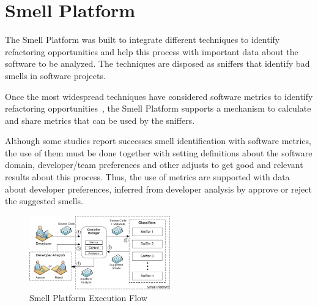 \documentclass[conference]{IEEEtran}
\begin{document}
\section{Smell Platform}
\label{sec:approach}

The Smell Platform was built to integrate different techniques to identify refactoring opportunities and help this process with important data about the software to be analyzed. The techniques are disposed as sniffers that identify bad smells in software projects. 

Once the most widespread techniques have considered 
software metrics to identify refactoring opportunities~\cite{marinescu2004detection,salehie2006metric}, the Smell Platform supports a mechanism to calculate and share metrics that can be used by the sniffers. 

Although some studies report successes smell identification with software metrics, the use of them must be done together with setting definitions about the software domain, developer/team preferences and other adjusts to get good and relevant results about this process. Thus, the use of metrics are supported with data about developer preferences, inferred from developer analysis by approve or reject the suggested smells. 

\begin{figure}[!t]
\label{fig:flow}
\centering
\includegraphics[natwidth=658px, natheight=343px, width=230px]{imgs/flow.jpg}
\caption{Smell Platform Execution Flow}
\end{figure}
\end{document}
